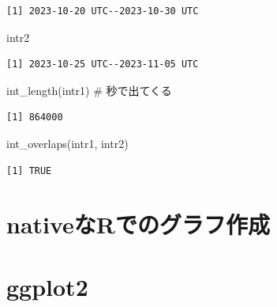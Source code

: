 \documentclass[
  letterpaper,
  DIV=11,
  numbers=noendperiod]{scrreprt}
\newenvironment{Shaded}{\begin{snugshade}}{\end{snugshade}}
\newcommand{\CommentTok}[1]{\textcolor[rgb]{0.37,0.37,0.37}{#1}}
\newcommand{\FunctionTok}[1]{\textcolor[rgb]{0.28,0.35,0.67}{#1}}
\newcommand{\NormalTok}[1]{\textcolor[rgb]{0.00,0.23,0.31}{#1}}
\begin{document}
\begin{verbatim}
[1] 2023-10-20 UTC--2023-10-30 UTC
\end{verbatim}

\begin{Shaded}
\begin{Highlighting}[]
\NormalTok{intr2}
\end{Highlighting}
\end{Shaded}

\begin{verbatim}
[1] 2023-10-25 UTC--2023-11-05 UTC
\end{verbatim}

\begin{Shaded}
\begin{Highlighting}[]
\FunctionTok{int\_length}\NormalTok{(intr1) }\CommentTok{\# 秒で出てくる}
\end{Highlighting}
\end{Shaded}

\begin{verbatim}
[1] 864000
\end{verbatim}

\begin{Shaded}
\begin{Highlighting}[]
\FunctionTok{int\_overlaps}\NormalTok{(intr1, intr2)}
\end{Highlighting}
\end{Shaded}

\begin{verbatim}
[1] TRUE
\end{verbatim}


\hypertarget{nativeux306arux3067ux306eux30b0ux30e9ux30d5ux4f5cux6210}{%
\chapter{nativeなRでのグラフ作成}\label{nativeux306arux3067ux306eux30b0ux30e9ux30d5ux4f5cux6210}}


\hypertarget{ggplot2}{%
\chapter{ggplot2}\label{ggplot2}}


\hypertarget{section}{%
\chapter{}\label{section}}
\end{document}
